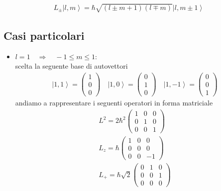\begin{equation}\begin{split}
L_\pm\left |l,m \right\rangle=\hbar \sqrt{\left(l\pm m+1\right)\left(l\mp m\right)}\left |l,m\pm 1 \right\rangle
\end{split}\end{equation}

\subsection{Casi particolari} %
\begin{itemize}
\item $l=1 \quad\Longrightarrow\quad -1\le m \le 1$:
\\
scelta la seguente base di autovettori
\begin{equation}\begin{split}
\left |1,1 \right\rangle=\left(\begin{matrix}1\\0\\0\end{matrix}\right) \quad \left |1,0 \right\rangle=\left(\begin{matrix}0\\1\\0\end{matrix}\right) \quad \left |1,-1 \right\rangle=\left(\begin{matrix}0\\0\\1\end{matrix}\right) 
\end{split}\end{equation}
andiamo a rappresentare i seguenti operatori in forma matriciale
\begin{equation}\begin{split}
L^2=2\hbar ^2 \left(\begin{matrix}1&0&0\\0&1&0\\0&0&1\end{matrix}\right) \\
L_z=\hbar \left(\begin{matrix}1&0&0\\0&0&0\\0&0&-1\end{matrix}\right) \\
L_+=\hbar \sqrt{2}\left(\begin{matrix}0&1&0\\0&0&1\\0&0&0\end{matrix}\right) \\

\end{split}
\end{equation}
\end{itemize}
